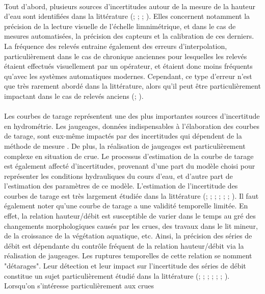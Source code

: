 \documentclass[11pt]{article}
\begin{document}
	\paragraph{} Tout d'abord, plusieurs sources d'incertitudes autour de la mesure de la hauteur d'eau sont identifiées dans la littérature (\citet{van_der_made_determination_1982}; \citet{petersen-overleir_uncertainty_2005}; \citet{mcmillan_benchmarking_2012}; \citet{horner_impact_2018}). Elles concernent notamment la précision de la lecture visuelle de l'échelle limnimétrique, et dans le cas de mesures automatisées, la précision des capteurs et la calibration de ces derniers. La fréquence des relevés entraine également des erreurs d'interpolation, particulièrement dans le cas de chronique anciennes pour lesquelles les relevés étaient effectués visuellement par un opérateur, et étaient donc moins fréquents qu'avec les systèmes automatiques modernes. Cependant, ce type d'erreur n'est que très rarement abordé dans la littérature, alors qu'il peut être particulièrement impactant dans le cas de relevés anciens (\citet{hamilton_quantifying_2012}; \citet{kuentz_hydrometrie_2014}).
	
	\paragraph{} Les courbes de tarage représentent une des plus importantes sources d'incertitude en hydrométrie. Les jaugeages, données indispensables à l'élaboration des courbes de tarage, sont eux-même impactés par des incertitudes qui dépendent de la méthode de mesure \citep{lecoz_quantification_2014}. De plus, la réalisation de jaugeages est particulièrement complexe en situation de crue. Le processus d'estimation de la courbe de tarage est également affecté d'incertitudes, provenant d'une part du modèle choisi pour représenter les conditions hydrauliques du cours d'eau, et d'autre part de l'estimation des paramètres de ce modèle. L'estimation de l'incertitude des courbes de tarage est très largement étudiée dans la littérature (\citet{petersen-overleir_bayesian_2009}; \citet{juston_rating_2014}; \citet{le_coz_combining_2014}; \citet{morlot_dynamic_2014}; \citet{coxon_novel_2015}; \citet{mcmillan_rating_2015}; \citet{mansanarez_rapid_2019}). Il faut également noter qu'une courbe de tarage a une validité temporelle limitée. En effet, la relation hauteur/débit est susceptible de varier dans le temps au gré des changements morphologiques causés par les crues, des travaux dans le lit mineur, de la croissance de la végétation aquatique, etc. Ainsi, la précision des séries de débit est dépendante du contrôle fréquent de la relation hauteur/débit via la réalisation de jaugeages. Les ruptures temporelles de cette relation se nomment "détarages". Leur détection et leur impact sur l'incertitude des séries de débit constitue un sujet particulièrement étudié dans la littérature (\citet{westerberg_stage-discharge_2011}; \citet{guerrero_temporal_2012}; \citet{morlot_dynamic_2014}; \citet{lapuszek_methods_2015}; \citet{mcmillan_impacts_2010}; \citet{darienzo_detection_2021}; \citet{mansanarez_shift_2019}). Lorsqu'on s'intéresse particulièrement aux crues 
	
\end{document}
